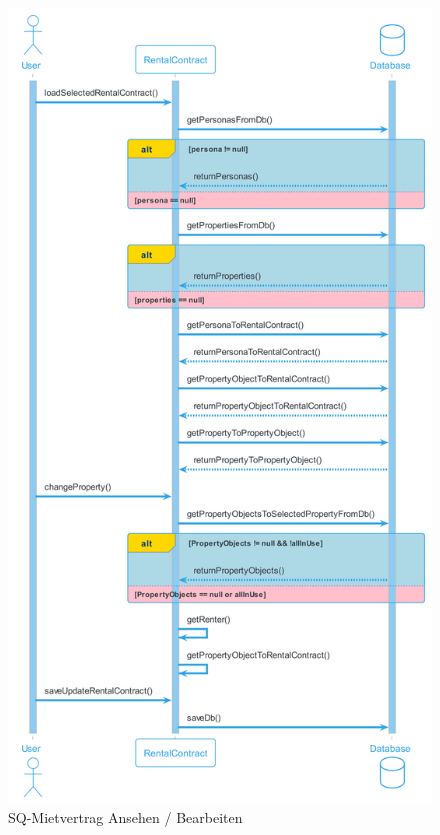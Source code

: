 \begin{figure}[H]
  \begin{center}
    \includegraphics[height=1\textheight]{content/diagrams/out/sequenzdiagram/mietvertragEditieren/mietvertragEditieren.png}
    \caption{SQ-Mietvertrag Ansehen / Bearbeiten}

  \end{center}
\end{figure}

